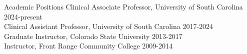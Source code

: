 
\begin{rSection}{Academic Positions}
    Clinical Associate Professor, University of South Carolina \hfill 2024-present\\
	Clinical Assistant Professor, University of South Carolina \hfill 2017-2024\\
	Graduate Instructor, Colorado State University \hfill 2013-2017\\
	Instructor, Front Range Community College \hfill 2009-2014\\
\end{rSection}
